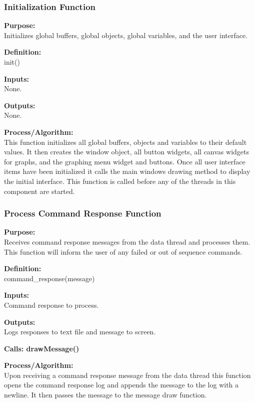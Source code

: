 \documentclass[10pt,draftclsnofoot,onecolumn,retainorgcmds]{IEEEtran}
\begin{document}
\subsubsection{Initialization Function}
{\bf Purpose:} \\
Initializes global buffers, global objects, global variables, and the user interface. \par
{\bf Definition:} \\ 
init() \par
{\bf Inputs:} \\ None. \par
{\bf Outputs:} \\None. \par
{\bf Process/Algorithm:} \\
This function initializes all global buffers, objects and variables to their default values. It then creates the window object, all button widgets, all canvas widgets for graphs, and the graphing menu widget and buttons. Once all user interface items have been initialized it calls the main windows drawing method to display the initial interface. This function is called before any of the threads in this component are started. \par

\subsubsection{Process Command Response Function}
{\bf Purpose:} \\
Receives command response messages from the data thread and processes them. This function will inform the user of any failed or out of sequence commands.  \par
{\bf Definition:} \\ 
command\_response(message) \par
{\bf Inputs:} \\  Command response to process. \par
{\bf Outputs:} \\ Logs responses to text file and message to screen. \par
{\bf Calls: drawMessage()}\par
{\bf Process/Algorithm:} \\
Upon receiving a command response message from the data thread this function opens the command response log and appends the message to the log with a newline. It then passes the message to the message draw function. \par
\end{document}
